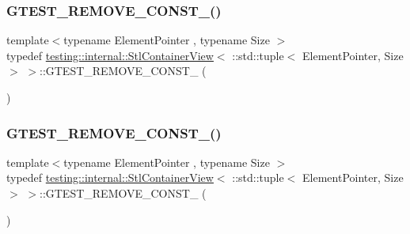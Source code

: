 \subsubsection{\texorpdfstring{GTEST\_REMOVE\_CONST\_()}{GTEST\_REMOVE\_CONST\_()}\hspace{0.1cm}{\footnotesize\ttfamily [1/2]}}
{\footnotesize\ttfamily template$<$typename Element\+Pointer , typename Size $>$ \\
typedef \mbox{\hyperlink{classtesting_1_1internal_1_1_stl_container_view}{testing\+::internal\+::\+Stl\+Container\+View}}$<$ \+::std\+::tuple$<$ Element\+Pointer, Size $>$ $>$\+::G\+T\+E\+S\+T\+\_\+\+R\+E\+M\+O\+V\+E\+\_\+\+C\+O\+N\+S\+T\+\_\+ (\begin{DoxyParamCaption}\item[{typename \mbox{\hyperlink{structtesting_1_1internal_1_1_pointee_of}{internal\+::\+Pointee\+Of}}$<$ Element\+Pointer $>$\+::\mbox{\hyperlink{classtesting_1_1internal_1_1_stl_container_view_3_01_1_1std_1_1tuple_3_01_element_pointer_00_01_size_01_4_01_4_aaa0289cd65ef99ea632d2fb0ad5480eb}{type}}}]{ }\end{DoxyParamCaption})}

\mbox{\label{classtesting_1_1internal_1_1_stl_container_view_3_01_1_1std_1_1tuple_3_01_element_pointer_00_01_size_01_4_01_4_a860d053b2a834fa591f4340c3778e63c}} 
\subsubsection{\texorpdfstring{GTEST\_REMOVE\_CONST\_()}{GTEST\_REMOVE\_CONST\_()}\hspace{0.1cm}{\footnotesize\ttfamily [2/2]}}
{\footnotesize\ttfamily template$<$typename Element\+Pointer , typename Size $>$ \\
typedef \mbox{\hyperlink{classtesting_1_1internal_1_1_stl_container_view}{testing\+::internal\+::\+Stl\+Container\+View}}$<$ \+::std\+::tuple$<$ Element\+Pointer, Size $>$ $>$\+::G\+T\+E\+S\+T\+\_\+\+R\+E\+M\+O\+V\+E\+\_\+\+C\+O\+N\+S\+T\+\_\+ (\begin{DoxyParamCaption}\item[{typename \mbox{\hyperlink{structtesting_1_1internal_1_1_pointee_of}{internal\+::\+Pointee\+Of}}$<$ Element\+Pointer $>$\+::\mbox{\hyperlink{classtesting_1_1internal_1_1_stl_container_view_3_01_1_1std_1_1tuple_3_01_element_pointer_00_01_size_01_4_01_4_aaa0289cd65ef99ea632d2fb0ad5480eb}{type}}}]{ }\end{DoxyParamCaption})}



